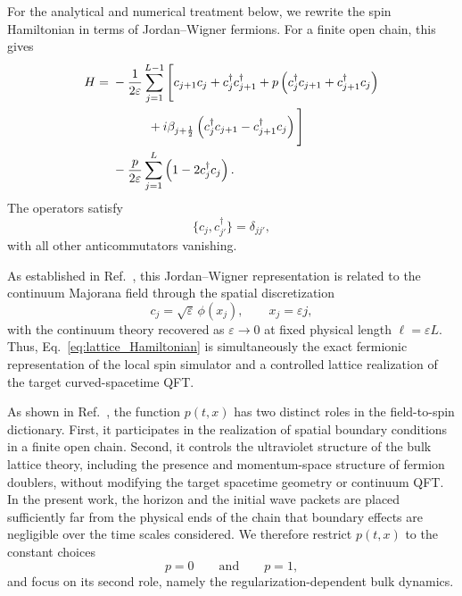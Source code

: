 \documentclass[reprint,amsmath,amssymb,aps,showkeys,superscriptaddress]{revtex4-2}
\begin{document}
For the analytical and numerical treatment below, we rewrite the
spin Hamiltonian in terms of Jordan--Wigner fermions. For a finite
open chain, this gives
\begin{align}
  H
  ={}&
  -\frac{1}{2\varepsilon}
  \sum_{j=1}^{L-1}
  \Bigg[
    c_{j+1}c_j
    +
    c_j^\dagger c_{j+1}^\dagger
    +
    p\left(
      c_j^\dagger c_{j+1}
      +
      c_{j+1}^\dagger c_j
    \right)
  \nonumber\\
  &\hspace{10mm}
    +
    i\beta_{j+\frac12}
    \left(
      c_j^\dagger c_{j+1}
      -
      c_{j+1}^\dagger c_j
    \right)
  \Bigg]
  \nonumber\\
  &-
  \frac{p}{2\varepsilon}
  \sum_{j=1}^{L}
  \left(
    1-2c_j^\dagger c_j
  \right).
  \label{eq:lattice_Hamiltonian}
\end{align}
The operators satisfy
\begin{equation}
  \{c_j,c_{j'}^\dagger\}
  =
  \delta_{jj'},
  \label{eq:lattice_anticommutation}
\end{equation}
with all other anticommutators vanishing.

As established in Ref.~\cite{Kinoshita2025}, this Jordan--Wigner
representation is related to the continuum Majorana field through
the spatial discretization
\begin{equation}
  c_j
  =
  \sqrt{\varepsilon}\,
  \phi(x_j),
  \qquad
  x_j=\varepsilon j,
  \label{eq:continuum_identification}
\end{equation}
with the continuum theory recovered as
$\varepsilon\to0$ at fixed physical length
$\ell=\varepsilon L$. Thus,
Eq.~\eqref{eq:lattice_Hamiltonian} is simultaneously the exact
fermionic representation of the local spin simulator and a
controlled lattice realization of the target curved-spacetime QFT.

As shown in Ref.~\cite{KinoshitaBoundary2026}, the function
$p(t,x)$ has two distinct roles in the field-to-spin dictionary.
First, it participates in the realization of spatial boundary
conditions in a finite open chain. Second, it controls the
ultraviolet structure of the bulk lattice theory, including the
presence and momentum-space structure of fermion doublers, without
modifying the target spacetime geometry or continuum QFT. In the
present work, the horizon and the initial wave packets are placed
sufficiently far from the physical ends of the chain that boundary
effects are negligible over the time scales considered. We therefore
restrict $p(t,x)$ to the constant choices
\begin{equation}
  p=0
  \qquad\text{and}\qquad
  p=1,
  \label{eq:p_choices}
\end{equation}
and focus on its second role, namely the regularization-dependent
bulk dynamics.
\end{document}
